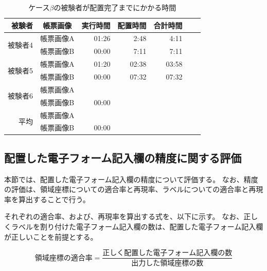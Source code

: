 \begin{table}[t]
	\caption{ケース$\beta$の被験者が配置完了までにかかる時間}
	\label{tb:result_caseB_time}
	\centering
	\begin{tabular}{rc||rrrr|r}
		被験者 & 帳票画像 & 実行時間 & 配置時間 & 合計時間 \\
        \hline \hline

		\multirow{2}{*}{被験者4} & 帳票画像A & 01:26 & 2:48 & 4:11 \\
                                & 帳票画像B & 00:00 & 7:11 & 7:11 \\
                                \hline

		\multirow{2}{*}{被験者5} & 帳票画像A & 01:20 & 02:38 & 03:58 \\
                                & 帳票画像B & 00:00 & 07:32 & 07:32 \\
                                \hline

		\multirow{2}{*}{被験者6} & 帳票画像A & &  &  \\
                                & 帳票画像B & 00:00 &  &  \\
                                \hline \hline

		\multirow{2}{*}{平均}   & 帳票画像A &  &  &  \\
                               & 帳票画像B & 00:00 &  &  \\
	\end{tabular}
\end{table}

\subsection{配置した電子フォーム記入欄の精度に関する評価}\label{subsec:evalue_accuracy}
本節では、配置した電子フォーム記入欄の精度について評価する。
なお、精度の評価は、領域座標についての適合率と再現率、ラベルについての適合率と再現率を算出することで行う。

それぞれの適合率、および、再現率を算出する式を、以下に示す。
なお、正しくラベルを割り付けた電子フォーム記入欄の数は、配置した電子フォーム記入欄が正しいことを前提とする。

\begin{equation}
    領域座標の適合率=\frac{正しく配置した電子フォーム記入欄の数}{出力した領域座標の数}
\end{equation}

